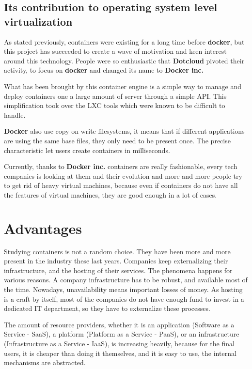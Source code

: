 \subsection{Its contribution to operating system level virtualization}

As stated previously, containers were existing for a long time before
\textbf{docker}, but this project has succeeded to create a wave of motivation
and keen interest around this technology. People were so enthusiastic that
\textbf{Dotcloud} pivoted their activity, to focus on \textbf{docker} and
changed its name to \textbf{Docker inc.}

What has been brought by this container engine is a simple way to manage and
deploy containers one a large amount of server through a simple API. This
simplification took over the LXC tools which were known to be difficult to
handle.

\textbf{Docker} also use copy on write filesystems, it means that if different
applications are using the same base files, they only need to be present once.
The precise characteristic let users create containers in milliseconds.

Currently, thanks to \textbf{Docker inc.} containers are really fashionable,
every tech companies is looking at them and their evolution and more and more
people try to get rid of heavy virtual machines, because even if containers do
not have all the features of virtual machines, they are good enough in a lot of
cases.

\section{Advantages}

Studying containers is not a random choice. They have been more and more
present in the industry these last years. Companies keep externalizing their
infrastructure, and the hosting of their services. The phenomena happens for
various reasons. A company infrastructure has to be robust, and available most
of the time. Nowadays, unavailability means important losses of money. As
hosting is a craft by itself, most of the companies do not have enough fund to
invest in a dedicated IT department, so they have to externalize these
processes.

The amount of resource providers, whether it is an application (Software as a
Service - SaaS), a platform (Platform as a Service - PaaS), or an
infrastructure (Infrastructure as a Service - IaaS), is increasing heavily,
because for the final users, it is cheaper than doing it themselves, and it is
easy to use, the internal mechanisms are abstracted.

